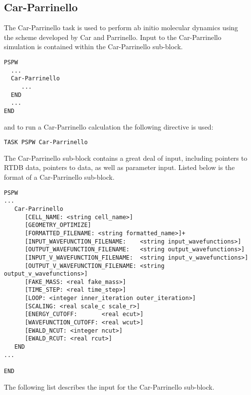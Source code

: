 \subsection{Car-Parrinello}
The Car-Parrinello task is used to perform ab initio molecular dynamics
using the scheme developed by Car and Parrinello. 
Input to the Car-Parrinello simulation is contained
within the Car-Parrinello sub-block.
\begin{verbatim}
PSPW
  ...
  Car-Parrinello
     ...
  END
  ...
END
\end{verbatim}
and to run a Car-Parrinello calculation the following directive is used:
\begin{verbatim}
TASK PSPW Car-Parrinello 
\end{verbatim}
The Car-Parrinello sub-block contains a great deal
of input, including pointers to RTDB data, pointers to data, as well as
parameter input.  Listed below is the format of a Car-Parrinello sub-block.
\begin{verbatim}
PSPW
...
   Car-Parrinello
      [CELL_NAME: <string cell_name>]
      [GEOMETRY_OPTIMIZE]
      [FORMATTED_FILENAME: <string formatted_name>]+
      [INPUT_WAVEFUNCTION_FILENAME:    <string input_wavefunctions>]
      [OUTPUT_WAVEFUNCTION_FILENAME:   <string output_wavefunctions>]
      [INPUT_V_WAVEFUNCTION_FILENAME:  <string input_v_wavefunctions>]
      [OUTPUT_V_WAVEFUNCTION_FILENAME: <string output_v_wavefunctions>]
      [FAKE_MASS: <real fake_mass>]
      [TIME_STEP: <real time_step>]
      [LOOP: <integer inner_iteration outer_iteration>]
      [SCALING: <real scale_c scale_r>]
      [ENERGY_CUTOFF:       <real ecut>]
      [WAVEFUNCTION_CUTOFF: <real wcut>]
      [EWALD_NCUT: <integer ncut>]
      [EWALD_RCUT: <real rcut>]
   END
...

END
\end{verbatim}
The following list describes the input for the Car-Parrinello
sub-block.
